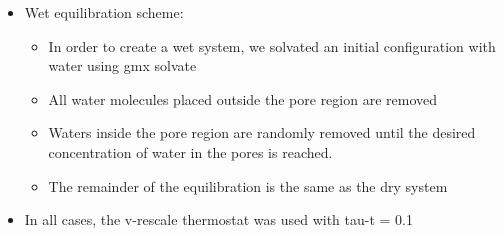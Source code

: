 \documentclass{article}
\begin{document}
\begin{itemize}
      \item Wet equilibration scheme: 
      \begin{itemize}
	  \item In order to create a wet system, we solvated an initial configuration with water using gmx solvate
          \item All water molecules placed outside the pore region are removed 
	  \item Waters inside the pore region are randomly removed until the desired concentration
	  of water in the pores is reached. 
	  \item The remainder of the equilibration is the same as the dry system
      \end{itemize}
      \item In all cases, the v-rescale thermostat was used with tau-t = 0.1 %
  \end{itemize}
\end{document}
